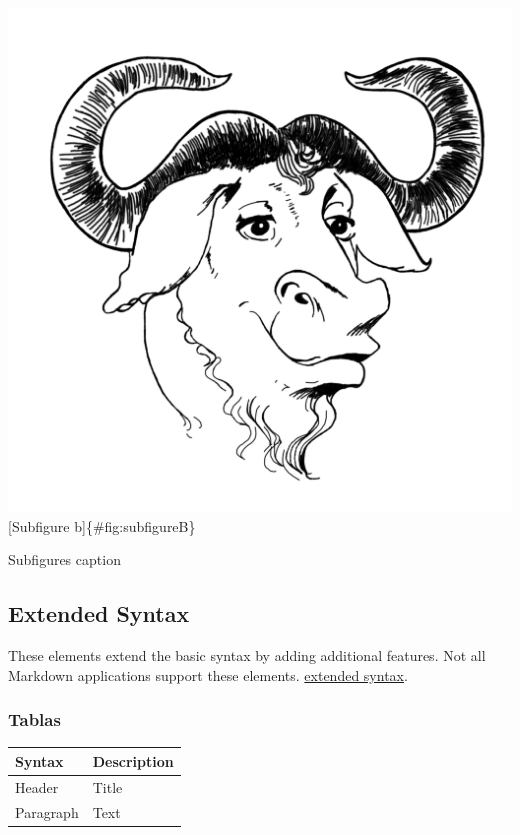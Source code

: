 \leavevmode{}%
\includegraphics{img/gnu.png} {[}Subfigure b{]}\{\#fig:subfigureB\}

Subfigures caption

\hypertarget{extended-syntax}{%
\subsection{Extended Syntax}\label{extended-syntax}}

These elements extend the basic syntax by adding additional features.
Not all Markdown applications support these elements.
\href{https://www.markdownguide.org/extended-syntax}{extended syntax}.

\hypertarget{sec:tablas}{%
\subsubsection{Tablas}\label{sec:tablas}}

\begin{longtable}[]{@{}ll@{}}
\toprule()
Syntax & Description \\
\midrule()
\endhead
Header & Title \\
Paragraph & Text \\
\bottomrule()
\end{longtable}

